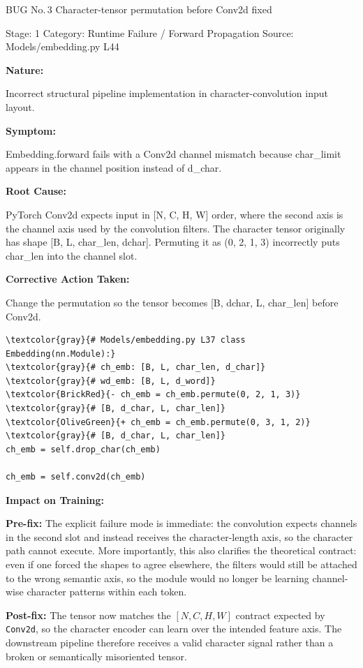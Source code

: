 \documentclass[10pt]{article}
\newcommand{\FieldLabel}[1]{%
 {\bfseries #1:}\par
}
\begin{document}
\begin{bugbox}{BUG No.\,3 \quad Character-tensor permutation before Conv2d fixed}
{\color{MetaGray}\small Stage: 1 \;\textbar\; Category: Runtime Failure / Forward Propagation \;\textbar\; Source: Models/embedding.py L44\par}
\vspace{0.22em}
\FieldLabel{Nature}
Incorrect structural pipeline implementation in character-convolution input layout.
\par
\vspace{0.35em}
\FieldLabel{Symptom}
Embedding.forward fails with a Conv2d channel mismatch because char\_limit appears in the channel position instead of d\_char.
\par
\vspace{0.35em}
\FieldLabel{Root Cause}
PyTorch Conv2d expects input in {[}N, C, H, W{]} order, where the second axis is the channel axis used by the convolution filters. The character tensor originally has shape {[}B, L, char\_len, dchar{]}. Permuting it as (0, 2, 1, 3) incorrectly puts char\_len into the channel slot.
\par
\vspace{0.35em}
\FieldLabel{Corrective Action Taken}
Change the permutation so the tensor becomes {[}B, dchar, L, char\_len{]} before Conv2d.
\par
\vspace{0.35em}
\begin{Verbatim}[commandchars=\\\{\},fontsize=\footnotesize,breaklines=true,breaksymbol={},frame=leftline,framerule=2pt,rulecolor=\color{gray!40},xleftmargin=6pt,formatcom=\singlespacing]
\textcolor{gray}{# Models/embedding.py L37 class Embedding(nn.Module):}
\textcolor{gray}{# ch_emb: [B, L, char_len, d_char]}
\textcolor{gray}{# wd_emb: [B, L, d_word]}
\textcolor{BrickRed}{- ch_emb = ch_emb.permute(0, 2, 1, 3)}
\textcolor{gray}{# [B, d_char, L, char_len]}
\textcolor{OliveGreen}{+ ch_emb = ch_emb.permute(0, 3, 1, 2)}
\textcolor{gray}{# [B, d_char, L, char_len]}
ch_emb = self.drop_char(ch_emb)

ch_emb = self.conv2d(ch_emb)
\end{Verbatim}
\vspace{0.22em}
\FieldLabel{Impact on Training}
\textbf{Pre-fix:} The explicit failure mode is immediate: the convolution expects channels in the second slot and instead receives the character-length axis, so the character path cannot execute. More importantly, this also clarifies the theoretical contract: even if one forced the shapes to agree elsewhere, the filters would still be attached to the wrong semantic axis, so the module would no longer be learning channel-wise character patterns within each token.\par\smallskip
\textbf{Post-fix:} The tensor now matches the \([N,C,H,W]\) contract expected by \texttt{Conv2d}, so the character encoder can learn over the intended feature axis. The downstream pipeline therefore receives a valid character signal rather than a broken or semantically misoriented tensor.
\par
\vspace{0.35em}
\end{bugbox}
\end{document}
